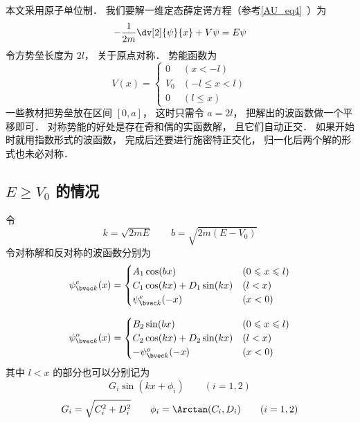 


本文采用原子单位制． 我们要解一维定态薛定谔方程（参考\autoref{AU_eq4}~）为
\begin{equation}
-\frac{1}{2m} \dv[2]{\psi}{x} + V\psi= E \psi
\end{equation}
令方势垒长度为 $2l$， 关于原点对称． 势能函数为
\begin{equation}
V(x) =
\begin{cases}
0 & (x < -l)\\
V_0 & (-l \leqslant x < l)\\
0 & (l \leqslant x)
\end{cases}
\end{equation}
一些教材把势垒放在区间 $[0, a]$， 这时只需令 $a = 2l$， 把解出的波函数做一个平移即可． 对称势能的好处是存在奇和偶的实函数解， 且它们自动正交． 如果开始时就用指数形式的波函数， 完成后还要进行施密特正交化， 归一化后两个解的形式也未必对称．

\subsection{$E \ge V_0$ 的情况}
令
\begin{equation}
k = \sqrt{2mE}
\qquad
b = \sqrt{2m(E-V_0)}
\end{equation}
令对称解和反对称的波函数分别为
\begin{equation}
\psi_{\bvec k}^e(x) =
\begin{cases}
A_1 \cos(bx) & (0 \leqslant x \leqslant l)\\
C_1 \cos(kx) + D_1 \sin(kx) & (l < x)\\
\psi_{\bvec k}^e(-x) & (x < 0)
\end{cases}
\end{equation}

\begin{equation}
\psi_{\bvec k}^o(x) =
\begin{cases}
B_2 \sin(bx) & (0 \leqslant x \leqslant l)\\
C_2 \cos(kx) + D_2 \sin(kx) & (l < x)\\
-\psi_{\bvec k}^o(-x) & (x < 0)
\end{cases}
\end{equation}
其中 $l < x$ 的部分也可以分别记为
\begin{equation}
G_i \sin(kx + \phi_i) \qquad (i = 1,2)
\end{equation}
\begin{equation}
G_i = \sqrt{C_i^2 + D_i^2}
\qquad
\phi_i = \Arctan(C_i, D_i)
\qquad
(i = 1,2)
\end{equation}


